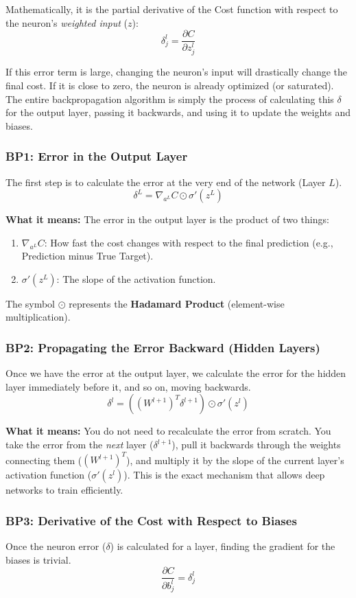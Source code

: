 \documentclass[11pt]{article}
\theoremstyle{smallexample}
\begin{document}
Mathematically, it is the partial derivative of the Cost function with respect to the neuron's \textit{weighted input} ($z$):
\[ \delta_j^l = \frac{\partial C}{\partial z_j^l} \]

If this error term is large, changing the neuron's input will drastically change the final cost. If it is close to zero, the neuron is already optimized (or saturated). The entire backpropagation algorithm is simply the process of calculating this $\delta$ for the output layer, passing it backwards, and using it to update the weights and biases.

\subsubsection{BP1: Error in the Output Layer}
The first step is to calculate the error at the very end of the network (Layer $L$).
\[ \delta^L = \nabla_{a^L} C \odot \sigma'(z^L) \]

\textbf{What it means:} 
The error in the output layer is the product of two things:
\begin{enumerate}
    \item $\nabla_{a^L} C$: How fast the cost changes with respect to the final prediction (e.g., Prediction minus True Target).
    \item $\sigma'(z^L)$: The slope of the activation function.
\end{enumerate}
The symbol $\odot$ represents the \textbf{Hadamard Product} (element-wise multiplication).

\subsubsection{BP2: Propagating the Error Backward (Hidden Layers)}
Once we have the error at the output layer, we calculate the error for the hidden layer immediately before it, and so on, moving backwards.
\[ \delta^l = \left((W^{l+1})^T \delta^{l+1}\right) \odot \sigma'(z^l) \]

\textbf{What it means:} 
You do not need to recalculate the error from scratch. You take the error from the \textit{next} layer ($\delta^{l+1}$), pull it backwards through the weights connecting them ($(W^{l+1})^T$), and multiply it by the slope of the current layer's activation function ($\sigma'(z^l)$). This is the exact mechanism that allows deep networks to train efficiently.

\subsubsection{BP3: Derivative of the Cost with Respect to Biases}
Once the neuron error ($\delta$) is calculated for a layer, finding the gradient for the biases is trivial.
\[ \frac{\partial C}{\partial b_j^l} = \delta_j^l \]
\end{document}
